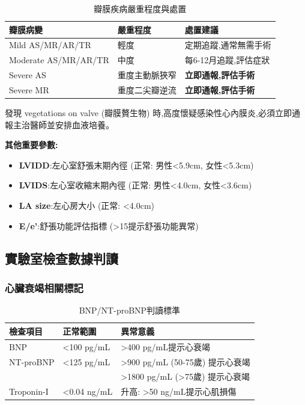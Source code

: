 \documentclass[12pt,a4paper]{article}
\newcommand{\warning}[1]{
    \par
    \noindent
    \begin{tcolorbox}[
        colback=warning_orange!5!white,
        colframe=warning_orange,
        title=\textbf{緊急通報},
        fonttitle=\bfseries,
        boxrule=1pt,
        arc=3pt,
        left=6pt,
        right=6pt,
        top=6pt,
        bottom=6pt
    ]
    #1
    \end{tcolorbox}
}
\begin{document}
\begin{table}[h]
    \centering
    \caption{瓣膜疾病嚴重程度與處置}
    \begin{tabular}{p{4cm} p{3cm} p{7cm}}
        \toprule
        \textbf{瓣膜病變} & \textbf{嚴重程度} & \textbf{處置建議} \\
        \midrule
        Mild AS/MR/AR/TR & 輕度 & 定期追蹤,通常無需手術 \\
        Moderate AS/MR/AR/TR & 中度 & 每6-12月追蹤,評估症狀 \\
        Severe AS & 重度主動脈狹窄 & \textcolor{emergency_red}{\textbf{立即通報,評估手術}} \\
        Severe MR & 重度二尖瓣逆流 & \textcolor{emergency_red}{\textbf{立即通報,評估手術}} \\
        \bottomrule
    \end{tabular}
\end{table}

\warning{
發現 vegetations on valve (瓣膜贅生物) 時,高度懷疑感染性心內膜炎,必須立即通報主治醫師並安排血液培養。
}

\textbf{其他重要參數:}
\begin{itemize}[nosep]
    \item \textbf{LVIDD}:左心室舒張末期內徑 (正常: 男性<5.9cm, 女性<5.3cm)
    \item \textbf{LVIDS}:左心室收縮末期內徑 (正常: 男性<4.0cm, 女性<3.6cm)
    \item \textbf{LA size}:左心房大小 (正常: <4.0cm)
    \item \textbf{E/e'}:舒張功能評估指標 (>15提示舒張功能異常)
\end{itemize}

\subsection{實驗室檢查數據判讀}

\subsubsection{心臟衰竭相關標記}
\begin{table}[h]
    \centering
    \caption{BNP/NT-proBNP判讀標準}
    \begin{tabular}{p{4cm} p{3cm} p{7cm}}
        \toprule
        \textbf{檢查項目} & \textbf{正常範圍} & \textbf{異常意義} \\
        \midrule
        BNP & <100 pg/mL & >400 pg/mL提示心衰竭 \\
        NT-proBNP & <125 pg/mL & >900 pg/mL (50-75歲) 提示心衰竭 \\
        & & >1800 pg/mL (>75歲) 提示心衰竭 \\
        Troponin-I & <0.04 ng/mL & 升高: >50 ng/mL提示心肌損傷 \\
        \bottomrule
    \end{tabular}
\end{table}
\end{document}
